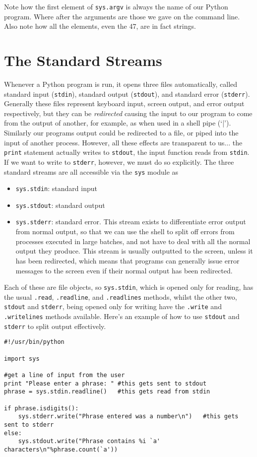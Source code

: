 Note how the first element of 
\texttt{sys.argv} is always the   name of our Python program. Where after the arguments are those we gave   on the command line. Also note how all the elements, even the 47, are   in fact strings.

\section{The Standard Streams}

Whenever a Python program is run, it opens three files   automatically, called standard input (\texttt{stdin}), standard output (\texttt{stdout}),   and standard error (\texttt{stderr}). Generally these files represent keyboard   input, screen output, and error output respectively, but they can be   \textit{redirected} causing the input to our program to come   from the output of another, for example, as when used in a shell pipe   (`|'). Similarly our programs output could be redirected to a file, or   piped into the input of another process. However, all these effects are   transparent to us... the \texttt{print} statement actually writes to \texttt{stdout},   the input function reads from \texttt{stdin}. If we want to write to \texttt{stderr},   however, we must do so explicitly. The three standard streams are all   accessible via the \texttt{sys} module as
\begin{itemize}
	\item 
\texttt{sys.stdin}: standard input
	\item 
\texttt{sys.stdout}: standard output
	\item 
\texttt{sys.stderr}: standard error. This stream exists to    differentiate error output from normal output, so that we can use    the shell to split off errors from processes executed in large    batches, and not have to deal with all the normal output they    produce. This stream is usually outputted to the screen, unless it    has been redirected, which means that programs can generally issue    error messages to the screen even if their normal output has been    redirected.
\end{itemize}

Each of these are file objects, so \texttt{sys.stdin}, which is opened only   for reading, has the usual 
\texttt{.read}, 
\texttt{.readline},   and 
\texttt{.readlines} methods, whilst the other two, \texttt{stdout} and   \texttt{stderr}, being opened only for writing have the 
\texttt{.write} and   
\texttt{.writelines} methods available. Here's an example of how to   use \texttt{stdout} and \texttt{stderr} to split output effectively.
\begin{lstlisting}
#!/usr/bin/python

import sys

#get a line of input from the user
print "Please enter a phrase: "	#this gets sent to stdout
phrase = sys.stdin.readline()	#this gets read from stdin

if phrase.isdigits():
    sys.stderr.write("Phrase entered was a number\n")	#this gets sent to stderr
else:
    sys.stdout.write("Phrase contains %i `a' characters\n"%phrase.count(`a'))
\end{lstlisting}

